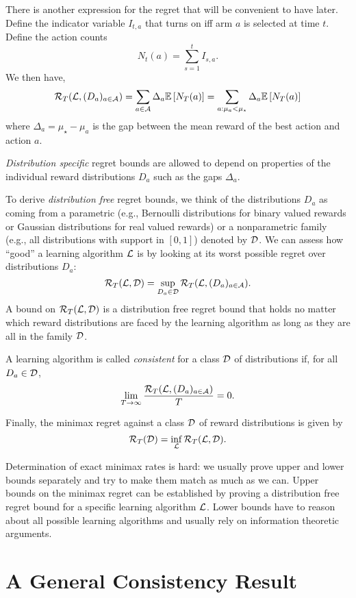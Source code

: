 \documentclass[11pt]{article}
\begin{document}
There is another expression for the regret that will be convenient to have later. Define the indicator variable $I_{t,a}$ that turns on iff arm $a$ is selected at time $t$. Define the action counts
\[
N_t(a) = \sum_{s=1}^t I_{s,a} .
\]
We then have,
\begin{equation}\label{eq:mabregret2}
\mathcal{R}_T(\mathcal{L}, (D_a)_{a \in \mathcal{A}}) = \sum_{a \in \mathcal{A}} \Delta_a \mathbb{E}\left[ N_T(a) \right] = \sum_{a: \mu_a < \mu_\star} \Delta_a \mathbb{E}\left[ N_T(a) \right]
\end{equation}
where $\Delta_a = \mu_\star - \mu_a$ is the gap between the mean reward of the best action and action $a$.

\emph{Distribution specific} regret bounds are allowed to depend on properties of the individual reward distributions $D_a$ such as the gaps $\Delta_a$.

To derive \emph{distribution free} regret bounds, we think of the distributions $D_a$ as coming from a parametric (e.g., Bernoulli distributions for binary valued rewards or Gaussian distributions for real valued rewards) or a nonparametric family
(e.g., all distributions with support in $[0,1]$) denoted by $\mathcal{D}$. We can assess how ``good'' a learning algorithm $\mathcal{L}$ is by looking at its worst possible regret over distributions $D_a$:
\[
\mathcal{R}_T(\mathcal{L}, \mathcal{D}) = \sup_{D_a \in \mathcal{D}} \mathcal{R}_T (\mathcal{L}, (D_a)_{a \in \mathcal{A}}) .
\]
A bound on $\mathcal{R}_T(\mathcal{L}, \mathcal{D})$ is a distribution free regret bound that holds no matter which reward distributions are faced by the learning algorithm as long as they are all in the family $\mathcal{D}$.

A learning algorithm is called \emph{consistent} for a class $\mathcal{D}$ of distributions if, for all $D_a \in \mathcal{D}$,
\[
\lim_{T\to \infty} \frac{\mathcal{R}_T(\mathcal{L}, (D_a)_{a \in \mathcal{A}})}{T} = 0 .
\]

Finally, the minimax regret against a class $\mathcal{D}$ of reward distributions is given by
\[
\mathcal{R}_T(\mathcal{D}) = \inf_{\mathcal{L}} \mathcal{R}_T(\mathcal{L}, \mathcal{D}) .
\]

Determination of exact minimax rates is hard: we usually prove upper and lower bounds separately and try to make them match as much as we can.
Upper bounds on the minimax regret can be established by proving a distribution free regret bound for a specific learning algorithm $\mathcal{L}$. Lower bounds have to reason about all 
possible learning algorithms and usually rely on information theoretic arguments.

\section{A General Consistency Result}
\end{document}
